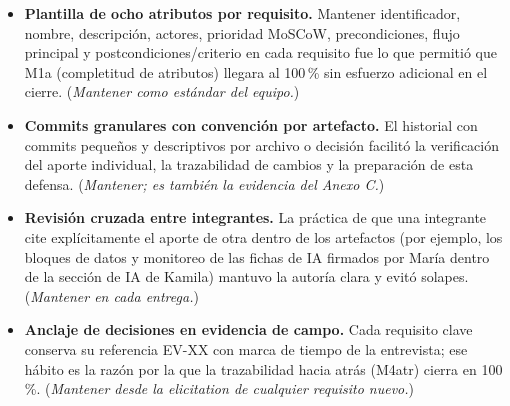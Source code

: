 \begin{itemize}[leftmargin=0.8cm]
  \item \textbf{Plantilla de ocho atributos por requisito.} Mantener identificador, nombre, descripci\'on, actores, prioridad MoSCoW, precondiciones, flujo principal y postcondiciones/criterio en cada requisito fue lo que permiti\'o que M1a (completitud de atributos) llegara al 100\,\% sin esfuerzo adicional en el cierre. (\emph{Mantener como est\'andar del equipo.})
  \item \textbf{Commits granulares con convenci\'on por artefacto.} El historial con commits peque\~nos y descriptivos por archivo o decisi\'on facilit\'o la verificaci\'on del aporte individual, la trazabilidad de cambios y la preparaci\'on de esta defensa. (\emph{Mantener; es tambi\'en la evidencia del Anexo C.})
  \item \textbf{Revisi\'on cruzada entre integrantes.} La pr\'actica de que una integrante cite expl\'icitamente el aporte de otra dentro de los artefactos (por ejemplo, los bloques de datos y monitoreo de las fichas de IA firmados por Mar\'ia dentro de la secci\'on de IA de Kamila) mantuvo la autor\'ia clara y evitó solapes. (\emph{Mantener en cada entrega.})
  \item \textbf{Anclaje de decisiones en evidencia de campo.} Cada requisito clave conserva su referencia EV-XX con marca de tiempo de la entrevista; ese h\'abito es la raz\'on por la que la trazabilidad hacia atr\'as (M4atr) cierra en 100\,\%. (\emph{Mantener desde la elicitation de cualquier requisito nuevo.})
\end{itemize}

